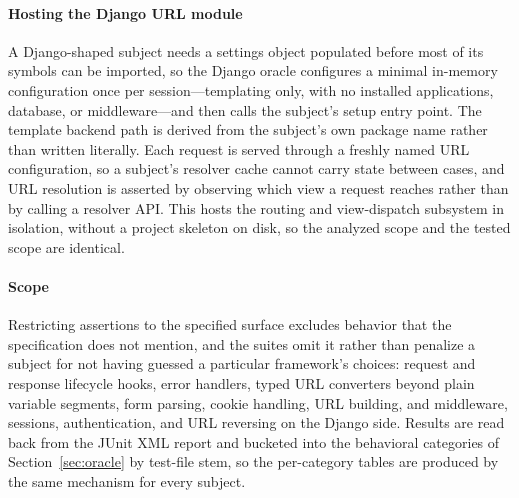 \paragraph{Hosting the Django URL module}
A Django-shaped subject needs a settings object populated before most of
its symbols can be imported, so the Django oracle configures a minimal
in-memory configuration once per session---templating only, with no
installed applications, database, or middleware---and then calls the
subject's setup entry point. The template backend path is derived from
the subject's own package name rather than written literally. Each
request is served through a freshly named URL configuration, so a
subject's resolver cache cannot carry state between cases, and URL
resolution is asserted by observing which view a request reaches rather
than by calling a resolver API. This hosts the routing and
view-dispatch subsystem in isolation, without a project skeleton on
disk, so the analyzed scope and the tested scope are identical.

\paragraph{Scope}
Restricting assertions to the specified surface excludes behavior that
the specification does not mention, and the suites omit it rather than
penalize a subject for not having guessed a particular framework's
choices: request and response lifecycle hooks, error handlers, typed URL
converters beyond plain variable segments, form parsing, cookie
handling, URL building, and middleware, sessions, authentication, and
URL reversing on the Django side. Results are read back from the JUnit
XML report and bucketed into the behavioral categories of
Section~\ref{sec:oracle} by test-file stem, so the per-category tables
are produced by the same mechanism for every subject.
